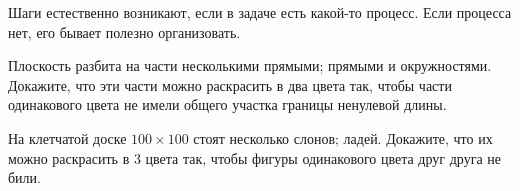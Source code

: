 \documentclass[12pt,a4paper]{article}
\begin{document}
Шаги естественно возникают, если в задаче есть какой-то процесс.
Если процесса нет, его бывает полезно организовать.


Плоскость разбита на части несколькими
 прямыми;
 прямыми и окружностями.
Докажите, что эти части можно раскрасить в два цвета так, чтобы части одинакового цвета не имели общего участка границы ненулевой длины.




На клетчатой доске $100\times100$ стоят несколько  слонов;  ладей.
Докажите, что их можно раскрасить в 3 цвета так, чтобы фигуры одинакового цвета друг друга не били.




\end{document}
